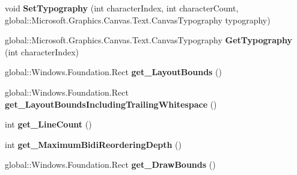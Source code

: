 \begin{DoxyCompactItemize}
\mbox{\label{class_microsoft_1_1_graphics_1_1_canvas_1_1_text_1_1_canvas_text_layout_aae0bff9344ddf4205aab37ecf0fdb8f4}} 
void {\bfseries Set\+Typography} (int character\+Index, int character\+Count, global\+::\+Microsoft.\+Graphics.\+Canvas.\+Text.\+Canvas\+Typography typography)
\item 
\mbox{\label{class_microsoft_1_1_graphics_1_1_canvas_1_1_text_1_1_canvas_text_layout_aa9de23a3678c4be132aa53e6409d9777}} 
global\+::\+Microsoft.\+Graphics.\+Canvas.\+Text.\+Canvas\+Typography {\bfseries Get\+Typography} (int character\+Index)
\item 
\mbox{\label{class_microsoft_1_1_graphics_1_1_canvas_1_1_text_1_1_canvas_text_layout_a772111b2573293b7d5a75e8d2396d598}} 
global\+::\+Windows.\+Foundation.\+Rect {\bfseries get\+\_\+\+Layout\+Bounds} ()
\item 
\mbox{\label{class_microsoft_1_1_graphics_1_1_canvas_1_1_text_1_1_canvas_text_layout_abce87ca208bfa0993ebbf52d11a81671}} 
global\+::\+Windows.\+Foundation.\+Rect {\bfseries get\+\_\+\+Layout\+Bounds\+Including\+Trailing\+Whitespace} ()
\item 
\mbox{\label{class_microsoft_1_1_graphics_1_1_canvas_1_1_text_1_1_canvas_text_layout_ada71c45dac02cdac6f56799104455aa5}} 
int {\bfseries get\+\_\+\+Line\+Count} ()
\item 
\mbox{\label{class_microsoft_1_1_graphics_1_1_canvas_1_1_text_1_1_canvas_text_layout_aac362a9384d9d8fa5cf235e2f129c939}} 
int {\bfseries get\+\_\+\+Maximum\+Bidi\+Reordering\+Depth} ()
\item 
\mbox{\label{class_microsoft_1_1_graphics_1_1_canvas_1_1_text_1_1_canvas_text_layout_a5230b0750a39afe10eab8898a0e65f82}} 
global\+::\+Windows.\+Foundation.\+Rect {\bfseries get\+\_\+\+Draw\+Bounds} ()

\end{DoxyCompactItemize}
